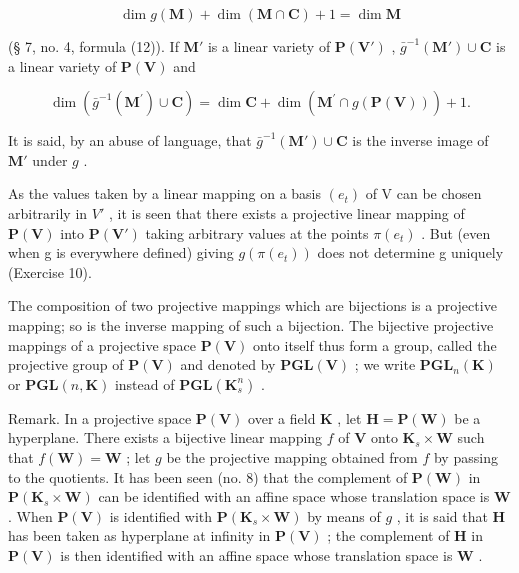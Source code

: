 \[
\dim g (\mathbf {M}) + \dim (\mathbf {M} \cap \mathbf {C}) + 1 = \dim \mathbf {M}\tag{7}
\]

(§ 7, no. 4, formula (12)). If \(\mathbf{M}'\) is a linear variety of \(\mathbf{P}(\mathbf{V}')\) , \(\bar{g}^{-1}(\mathbf{M}') \cup \mathbf{C}\) is a linear variety of \(\mathbf{P}(\mathbf{V})\) and

\[
\dim (\bar {g} ^ {- 1} (\mathbf {M} ^ {\prime}) \cup \mathbf {C}) = \dim \mathbf {C} + \dim (\mathbf {M} ^ {\prime} \cap g (\mathbf {P} (\mathbf {V}))) + 1.\tag{8}
\]

It is said, by an abuse of language, that \(\bar{g}^{-1}(\mathbf{M}') \cup \mathbf{C}\) is the inverse image of \(\mathbf{M}'\) under \(g\) .

As the values taken by a linear mapping on a basis \((e_{t})\) of V can be chosen arbitrarily in \(V'\) , it is seen that there exists a projective linear mapping of \(\mathbf{P}(\mathbf{V})\) into \(\mathbf{P}(\mathbf{V}')\) taking arbitrary values at the points \(\pi(e_{t})\) . But (even when g is everywhere defined) giving \(g(\pi(e_{t}))\) does not determine g uniquely (Exercise 10).

The composition of two projective mappings which are bijections is a projective mapping; so is the inverse mapping of such a bijection. The bijective projective mappings of a projective space \(\mathbf{P}(\mathbf{V})\) onto itself thus form a group, called the projective group of \(\mathbf{P}(\mathbf{V})\) and denoted by \(\mathbf{PGL}(\mathbf{V})\) ; we write \(\mathbf{PGL}_{n}(\mathbf{K})\) or \(\mathbf{PGL}(n,\mathbf{K})\) instead of \(\mathbf{PGL}(\mathbf{K}_{s}^{n})\) .

Remark. In a projective space \(\mathbf{P}(\mathbf{V})\) over a field \(\mathbf{K}\) , let \(\mathbf{H} = \mathbf{P}(\mathbf{W})\) be a hyperplane. There exists a bijective linear mapping \(f\) of \(\mathbf{V}\) onto \(\mathbf{K}_s \times \mathbf{W}\) such that \(f(\mathbf{W}) = \mathbf{W}\) ; let \(g\) be the projective mapping obtained from \(f\) by passing to the quotients. It has been seen (no. 8) that the complement of \(\mathbf{P}(\mathbf{W})\) in \(\mathbf{P}(\mathbf{K}_s \times \mathbf{W})\) can be identified with an affine space whose translation space is \(\mathbf{W}\) . When \(\mathbf{P}(\mathbf{V})\) is identified with \(\mathbf{P}(\mathbf{K}_s \times \mathbf{W})\) by means of \(g\) , it is said that \(\mathbf{H}\) has been taken as hyperplane at infinity in \(\mathbf{P}(\mathbf{V})\) ; the complement of \(\mathbf{H}\) in \(\mathbf{P}(\mathbf{V})\) is then identified with an affine space whose translation space is \(\mathbf{W}\) .


